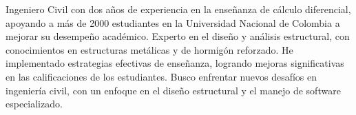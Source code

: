 

\begin{cvparagraph}

Ingeniero Civil con dos años de experiencia en la enseñanza de cálculo
diferencial, apoyando a más de 2000 estudiantes en la Universidad Nacional de
Colombia a mejorar su desempeño académico. Experto en el diseño y análisis estructural, con conocimientos en estructuras metálicas y de hormigón reforzado. He implementado estrategias efectivas de enseñanza, logrando mejoras significativas en las calificaciones de los estudiantes. Busco enfrentar nuevos desafíos en ingeniería civil, con un enfoque en el diseño estructural y el manejo de software especializado.

\end{cvparagraph}